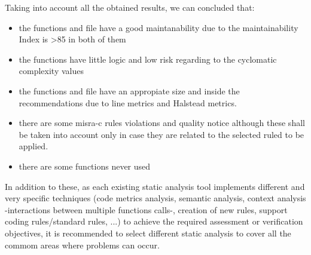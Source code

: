 Taking into account all the obtained results, we can concluded that:
\begin{itemize}
\item the functions and file have a good maintanability due to the maintainability Index is >85 in both of them
\item the functions have little logic and low risk regarding to the cyclomatic complexity values
\item the functions and file have an appropiate size and inside the recommendations due to line metrics and Halstead metrics.
\item there are some misra-c rules violations and quality notice although these shall be taken into account only in case they are related to the selected ruled to be applied.
\item there are some functions never used
\end{itemize}

In addition to these, as each existing static analysis tool implements different and very specific techniques (code metrics analysis, semantic analysis, context analysis -interactions between multiple functions calls-, creation of new rules, support coding rules/standard rules, ...) to achieve the required assessment or verification objectives, it is recommended to select different static analysis to cover all the commom areas where problems can occur.
